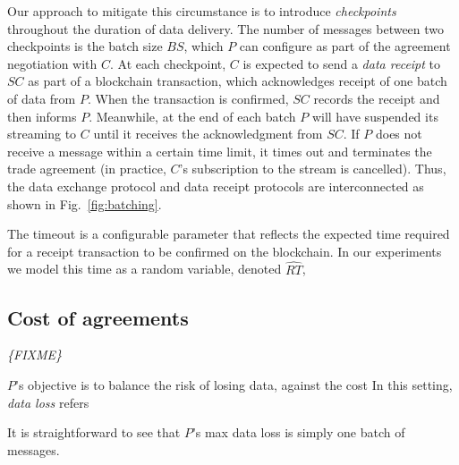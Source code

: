 \documentclass[letterpaper, 10 pt, conference]{ieeeconf}  %
\newcommand{\mynote}[1]{{\leavevmode\smaller\itshape\color{red}\{#1\}}}
\newcommand{\bs}{\ensuremath{\mathit{BS}}}
\newcommand{\ti}{\ensuremath{\mathit{TI}}}
\newcommand{\smartc}{\ensuremath{\mathit{SC}}}
\newcommand{\rtEst}{\ensuremath{\widehat{\mathit{RT}}}}
\begin{document}
Our approach to mitigate this circumstance is to introduce \textit{checkpoints} throughout the duration of data delivery. 
The number of messages between two checkpoints is the batch size \bs, which $P$ can configure as part of the agreement negotiation with $C$.
At each checkpoint, $C$ is expected to send a \textit{data receipt} to \smartc{} as part of a blockchain transaction, which acknowledges receipt of one batch of data from $P$.
When the transaction is confirmed, \smartc{} records the receipt and then informs $P$.
Meanwhile, at the end of each batch $P$ will have suspended its streaming to $C$ until it receives the acknowledgment from \smartc.
If $P$ does not receive a message within a certain time limit, it times out and terminates the trade agreement (in practice, $C$'s subscription to the stream is cancelled).
Thus, the data exchange protocol and data receipt protocols are interconnected as shown in Fig.~\ref{fig:batching}.

The timeout is a configurable parameter that reflects the expected time required for a receipt transaction to be confirmed on the blockchain. 
In our experiments we model this time as a random variable, denoted \rtEst, 



\subsection{Cost of agreements}  \label{sec:cost}

\mynote{FIXME}

$P$'s objective is to balance the risk of losing data, against the cost In this setting, \textit{data loss} refers 

It is straightforward to see that $P$'s max data loss is simply one batch  of messages.
\end{document}

